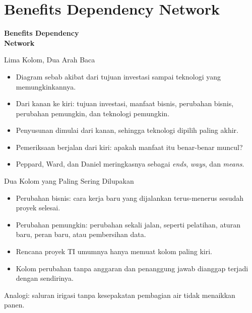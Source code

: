 \documentclass[aspectratio=169, table, 12pt]{beamer}
\begin{document}
\section{Benefits Dependency Network}

\begin{frame}{\hfill}
  \centering
  \Huge{\textbf{Benefits Dependency\\Network}}
\end{frame}

\begin{frame}{{\Large Lima Kolom, Dua Arah Baca}}
  \small
  \vspace{6pt}
  \begin{itemize}
    \item Diagram sebab akibat dari tujuan investasi sampai teknologi yang memungkinkannya.
    \item Dari kanan ke kiri: tujuan investasi, manfaat bisnis, perubahan bisnis, perubahan pemungkin,
          dan teknologi pemungkin.
    \item Penyusunan dimulai dari kanan, sehingga teknologi dipilih paling akhir.
    \item Pemeriksaan berjalan dari kiri: apakah manfaat itu benar-benar muncul?
    \item Peppard, Ward, dan Daniel meringkasnya sebagai \textit{ends}, \textit{ways}, dan \textit{means}.
  \end{itemize}
\end{frame}

\begin{frame}{{\Large Dua Kolom yang Paling Sering Dilupakan}}
  \small
  \vspace{6pt}
  \begin{itemize}
    \item Perubahan bisnis: cara kerja baru yang dijalankan terus-menerus sesudah proyek selesai.
    \item Perubahan pemungkin: perubahan sekali jalan, seperti pelatihan, aturan baru, peran baru, atau
          pembersihan data.
    \item Rencana proyek TI umumnya hanya memuat kolom paling kiri.
    \item Kolom perubahan tanpa anggaran dan penanggung jawab dianggap terjadi dengan sendirinya.
  \end{itemize}
  \vspace{6pt}
  Analogi: saluran irigasi tanpa kesepakatan pembagian air tidak menaikkan panen.
\end{frame}
\end{document}
